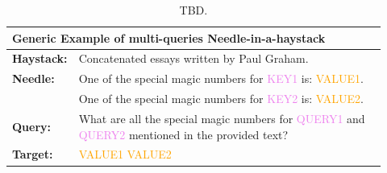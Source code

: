 \begin{table}[!h]
\begin{tabular}{p{0.1\linewidth}p{0.82\linewidth}}
\midrule
    \multicolumn{2}{l}{\textbf{Generic Example of multi-queries Needle-in-a-haystack}} \\ \midrule
    \textbf{Haystack:} & Concatenated essays written by Paul Graham.\\
    \textbf{Needle:} & One of the special magic numbers for \textcolor{violet}{KEY1} is: \textcolor{orange}{VALUE1}. \\
     & One of the special magic numbers for \textcolor{violet}{KEY2} is: \textcolor{orange}{VALUE2}. \\
    \textbf{Query:} & What are all the special magic numbers for \textcolor{violet}{QUERY1} and \textcolor{violet}{QUERY2} mentioned in the provided text?\\
    \textbf{Target:} & \textcolor{orange}{VALUE1 VALUE2} \\
\bottomrule
\end{tabular}
\caption{TBD.}
\label{tab:NIAH}
\end{table}